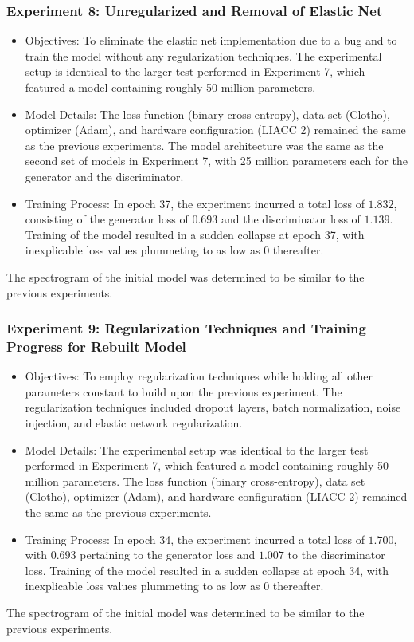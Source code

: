 \begin{frame}
    \frametitle{Experiment 8: Unregularized and Removal of Elastic Net}

    \begin{itemize}
        \item Objectives: To eliminate the elastic net implementation due to a bug and to train the model without any regularization techniques. The experimental setup is identical to the larger test performed in Experiment 7, which featured a model containing roughly 50 million parameters.
        \item Model Details: The loss function (binary cross-entropy), data set (Clotho), optimizer (Adam), and hardware configuration (LIACC 2) remained the same as the previous experiments. The model architecture was the same as the second set of models in Experiment 7, with 25 million parameters each for the generator and the discriminator.
        \item Training Process: In epoch 37, the experiment incurred a total loss of $1.832$, consisting of the generator loss of $0.693$ and the discriminator loss of $1.139$. Training of the model resulted in a sudden collapse at epoch 37, with inexplicable loss values plummeting to as low as 0 thereafter.
    \end{itemize}

The spectrogram of the initial model was determined to be similar to the previous experiments.
\end{frame}


\begin{frame}
    \frametitle{Experiment 9: Regularization Techniques and Training Progress for Rebuilt Model}

    \begin{itemize}
        \item Objectives: To employ regularization techniques while holding all other parameters constant to build upon the previous experiment. The regularization techniques included dropout layers, batch normalization, noise injection, and elastic network regularization.
        \item Model Details: The experimental setup was identical to the larger test performed in Experiment 7, which featured a model containing roughly 50 million parameters. The loss function (binary cross-entropy), data set (Clotho), optimizer (Adam), and hardware configuration (LIACC 2) remained the same as the previous experiments.
        \item Training Process: In epoch 34, the experiment incurred a total loss of $1.700$, with $0.693$ pertaining to the generator loss and $1.007$ to the discriminator loss. Training of the model resulted in a sudden collapse at epoch 34, with inexplicable loss values plummeting to as low as 0 thereafter.
    \end{itemize}

    The spectrogram of the initial model was determined to be similar to the previous experiments.
\end{frame}

